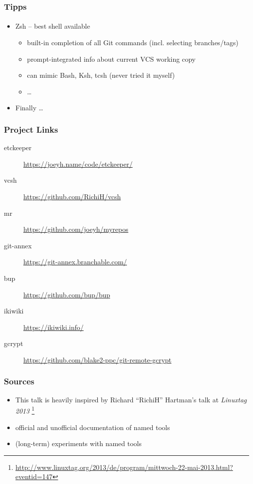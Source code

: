 \documentclass[english,hyperref={pdfpagelabels=false},aspectratio=169]{beamer}
\begin{document}
\begin{frame}[label=tipps]
  \frametitle{Tipps}
  \framesubtitle{}
  \begin{itemize}
    \item Zsh -- best shell available
      \begin{itemize}
        \item built-in completion of all Git commands (incl. selecting branches/tags)
        \item prompt-integrated info about current VCS working copy
        \item can mimic Bash, Ksh, tcsh {\tiny(never tried it myself)}
        \item \dots
      \end{itemize}
    \item Finally \dots
      \begin{center}
      \end{center}
  \end{itemize}
\end{frame}


\begin{frame}
  \frametitle{Project Links}
  \begin{description}
    \item[etckeeper] \url{https://joeyh.name/code/etckeeper/}
    \item[vcsh] \url{https://github.com/RichiH/vcsh}
    \item[mr] \url{https://github.com/joeyh/myrepos}
    \item[git-annex] \url{https://git-annex.branchable.com/}
    \item[bup] \url{https://github.com/bup/bup}
    \item[ikiwiki] \url{https://ikiwiki.info/}
    \item[gcrypt] \url{https://github.com/blake2-ppc/git-remote-gcrypt}
  \end{description}
\end{frame}


\begin{frame}
  \frametitle{Sources}
  \begin{itemize}
    \item This talk is heavily inspired by Richard ``RichiH'' Hartman's talk at \textit{Linuxtag 2013}
      \footnote{\tiny\url{http://www.linuxtag.org/2013/de/program/mittwoch-22-mai-2013.html?eventid=147}}
    \item official and unofficial documentation of named tools
    \item (long-term) experiments with named tools
  \end{itemize}
\end{frame}
\end{document}

